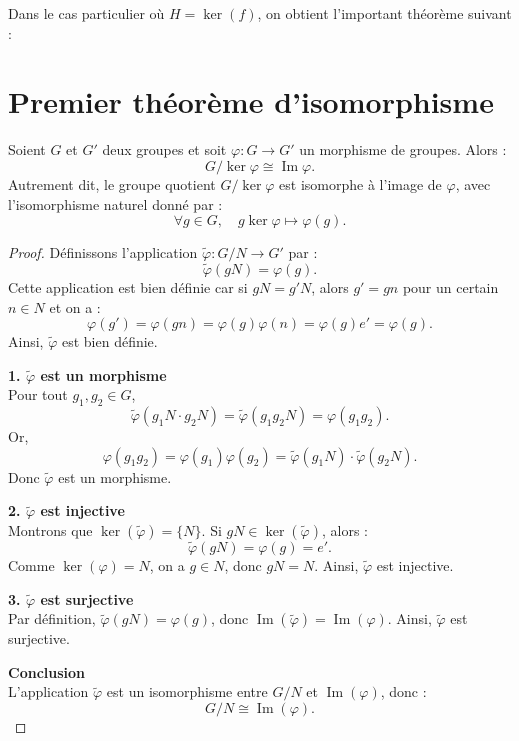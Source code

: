 Dans le cas particulier où $H = \ker(f)$, on obtient l’important théorème suivant :

\section{Premier théorème d'isomorphisme}

\begin{theoreme}
    Soient \( G \) et \( G' \) deux groupes et soit \( \varphi : G \to G' \) un morphisme de groupes. Alors :
    \[
    G / \ker \varphi \cong \operatorname{Im} \varphi.
    \]
    Autrement dit, le groupe quotient \( G / \ker \varphi \) est isomorphe à l'image de \( \varphi \), avec l'isomorphisme naturel donné par :
    \[
    \forall g \in G, \quad g \ker \varphi \mapsto \varphi(g).
    \]
\end{theoreme}

\begin{proof}
    Définissons l'application \( \tilde{\varphi} : G/N \to G' \) par :
    \[
    \tilde{\varphi}(gN) = \varphi(g).
    \]
    Cette application est bien définie car si \( gN = g'N \), alors \( g' = gn \) pour un certain \( n \in N \) et on a :
    \[
    \varphi(g') = \varphi(gn) = \varphi(g) \varphi(n) = \varphi(g) e' = \varphi(g).
    \]
    Ainsi, \( \tilde{\varphi} \) est bien définie.

    \textbf{1. \( \tilde{\varphi} \) est un morphisme} \\
    Pour tout \( g_1, g_2 \in G \),
    \[
    \tilde{\varphi}(g_1N \cdot g_2N) = \tilde{\varphi}(g_1 g_2 N) = \varphi(g_1 g_2).
    \]
    Or,
    \[
    \varphi(g_1 g_2) = \varphi(g_1) \varphi(g_2) = \tilde{\varphi}(g_1N) \cdot \tilde{\varphi}(g_2N).
    \]
    Donc \( \tilde{\varphi} \) est un morphisme.

    \textbf{2. \( \tilde{\varphi} \) est injective} \\
    Montrons que \( \ker(\tilde{\varphi}) = \{N\} \).
    Si \( gN \in \ker(\tilde{\varphi}) \), alors :
    \[
    \tilde{\varphi}(gN) = \varphi(g) = e'.
    \]
    Comme \( \ker(\varphi) = N \), on a \( g \in N \), donc \( gN = N \).
    Ainsi, \( \tilde{\varphi} \) est injective.

    \textbf{3. \( \tilde{\varphi} \) est surjective} \\
    Par définition, \( \tilde{\varphi}(gN) = \varphi(g) \), donc \( \operatorname{Im}(\tilde{\varphi}) = \operatorname{Im}(\varphi) \).
    Ainsi, \( \tilde{\varphi} \) est surjective.

    \textbf{Conclusion} \\
    L'application \( \tilde{\varphi} \) est un isomorphisme entre \( G/N \) et \( \operatorname{Im}(\varphi) \), donc :
    \[
    G/N \cong \operatorname{Im}(\varphi).
    \]
\end{proof}

